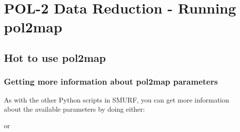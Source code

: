 \chapter{POL-2 Data Reduction - Running pol2map}
\label{sec:rundr}
\section{Hot to use pol2map}

\subsection*{Getting more information about pol2map parameters}



As with the other Python scripts in SMURF, you can get more information about the available
parameters by doing either:
\begin{terminalv}
\end{terminalv}
or
\begin{terminalv}
\end{terminalv}
